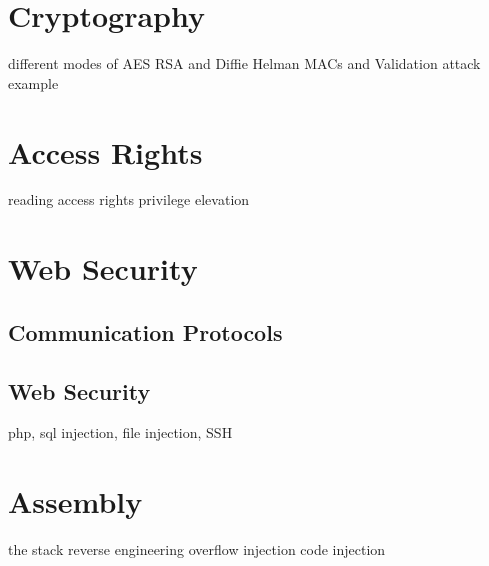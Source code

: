 \section{Cryptography}
different modes of AES
RSA and Diffie Helman
MACs and Validation
attack example

\section{Access Rights}
reading access rights
privilege elevation

\section{Web Security}
\subsection{Communication Protocols}
\subsection{Web Security}
php, sql injection, file injection, SSH

\section{Assembly}
the stack
reverse engineering
overflow injection
code injection
